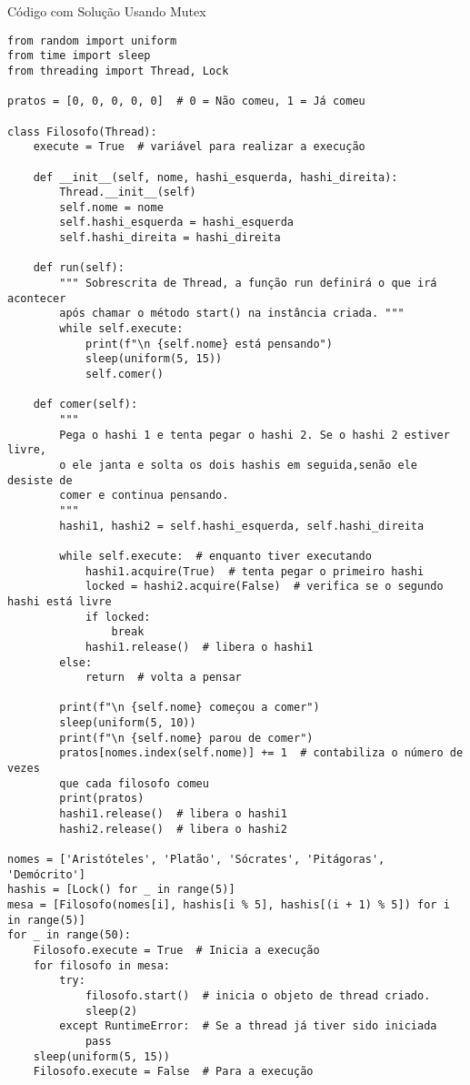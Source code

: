 Código com Solução Usando Mutex

\begin{verbatim}
from random import uniform
from time import sleep
from threading import Thread, Lock

pratos = [0, 0, 0, 0, 0]  # 0 = Não comeu, 1 = Já comeu

class Filosofo(Thread):
    execute = True  # variável para realizar a execução

    def __init__(self, nome, hashi_esquerda, hashi_direita): 
        Thread.__init__(self)
        self.nome = nome
        self.hashi_esquerda = hashi_esquerda
        self.hashi_direita = hashi_direita

    def run(self):
        """ Sobrescrita de Thread, a função run definirá o que irá acontecer
        após chamar o método start() na instância criada. """
        while self.execute:
            print(f"\n {self.nome} está pensando")
            sleep(uniform(5, 15))
            self.comer()

    def comer(self):
        """
        Pega o hashi 1 e tenta pegar o hashi 2. Se o hashi 2 estiver livre,
        o ele janta e solta os dois hashis em seguida,senão ele desiste de
        comer e continua pensando.
        """
        hashi1, hashi2 = self.hashi_esquerda, self.hashi_direita

        while self.execute:  # enquanto tiver executando
            hashi1.acquire(True)  # tenta pegar o primeiro hashi
            locked = hashi2.acquire(False)  # verifica se o segundo hashi está livre
            if locked:
                break
            hashi1.release()  # libera o hashi1
        else:
            return  # volta a pensar

        print(f"\n {self.nome} começou a comer")
        sleep(uniform(5, 10))
        print(f"\n {self.nome} parou de comer")
        pratos[nomes.index(self.nome)] += 1  # contabiliza o número de vezes 
        que cada filosofo comeu
        print(pratos)
        hashi1.release()  # libera o hashi1
        hashi2.release()  # libera o hashi2

nomes = ['Aristóteles', 'Platão', 'Sócrates', 'Pitágoras', 'Demócrito']
hashis = [Lock() for _ in range(5)]
mesa = [Filosofo(nomes[i], hashis[i % 5], hashis[(i + 1) % 5]) for i in range(5)]
for _ in range(50):
    Filosofo.execute = True  # Inicia a execução
    for filosofo in mesa:
        try:
            filosofo.start()  # inicia o objeto de thread criado.
            sleep(2)
        except RuntimeError:  # Se a thread já tiver sido iniciada
            pass
    sleep(uniform(5, 15))
    Filosofo.execute = False  # Para a execução
\end{verbatim}

